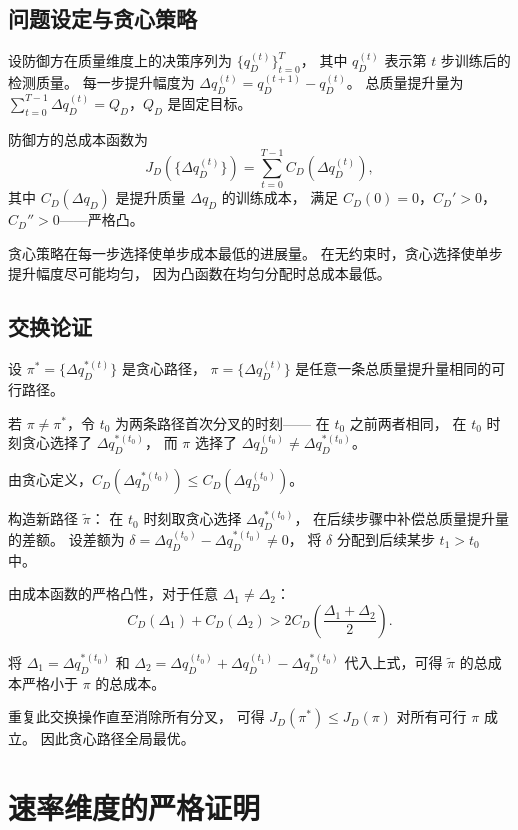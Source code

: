 \documentclass[11pt,a4paper]{article}
\begin{document}
\subsection{问题设定与贪心策略}

设防御方在质量维度上的决策序列为 \(\{q_D^{(t)}\}_{t=0}^{T}\)，
其中 \(q_D^{(t)}\) 表示第 \(t\) 步训练后的检测质量。
每一步提升幅度为 \(\Delta q_D^{(t)} = q_D^{(t+1)} - q_D^{(t)}\)。
总质量提升量为 \(\sum_{t=0}^{T-1} \Delta q_D^{(t)} = Q_D\)，\(Q_D\) 是固定目标。

防御方的总成本函数为
\[
J_D(\{\Delta q_D^{(t)}\}) = \sum_{t=0}^{T-1} C_D(\Delta q_D^{(t)}),
\]
其中 \(C_D(\Delta q_D)\) 是提升质量 \(\Delta q_D\) 的训练成本，
满足 \(C_D(0) = 0\)，\(C_D' > 0\)，\(C_D'' > 0\)——严格凸。

贪心策略在每一步选择使单步成本最低的进展量。
在无约束时，贪心选择使单步提升幅度尽可能均匀，
因为凸函数在均匀分配时总成本最低。

\subsection{交换论证}

设 \(\pi^* = \{\Delta q_D^{*(t)}\}\) 是贪心路径，
\(\pi = \{\Delta q_D^{(t)}\}\) 是任意一条总质量提升量相同的可行路径。

若 \(\pi \neq \pi^*\)，令 \(t_0\) 为两条路径首次分叉的时刻——
在 \(t_0\) 之前两者相同，
在 \(t_0\) 时刻贪心选择了 \(\Delta q_D^{*(t_0)}\)，
而 \(\pi\) 选择了 \(\Delta q_D^{(t_0)} \neq \Delta q_D^{*(t_0)}\)。

由贪心定义，\(C_D(\Delta q_D^{*(t_0)}) \le C_D(\Delta q_D^{(t_0)})\)。

构造新路径 \(\tilde{\pi}\)：
在 \(t_0\) 时刻取贪心选择 \(\Delta q_D^{*(t_0)}\)，
在后续步骤中补偿总质量提升量的差额。
设差额为 \(\delta = \Delta q_D^{(t_0)} - \Delta q_D^{*(t_0)} \neq 0\)，
将 \(\delta\) 分配到后续某步 \(t_1 > t_0\) 中。

由成本函数的严格凸性，对于任意 \(\Delta_1 \neq \Delta_2\)：
\[
C_D(\Delta_1) + C_D(\Delta_2) > 2 C_D\!\left(\frac{\Delta_1 + \Delta_2}{2}\right).
\]

将 \(\Delta_1 = \Delta q_D^{*(t_0)}\) 和
\(\Delta_2 = \Delta q_D^{(t_0)} + \Delta q_D^{(t_1)} - \Delta q_D^{*(t_0)}\)
代入上式，可得 \(\tilde{\pi}\) 的总成本严格小于 \(\pi\) 的总成本。

重复此交换操作直至消除所有分叉，
可得 \(J_D(\pi^*) \le J_D(\pi)\) 对所有可行 \(\pi\) 成立。
因此贪心路径全局最优。

\section{速率维度的严格证明}
\end{document}
